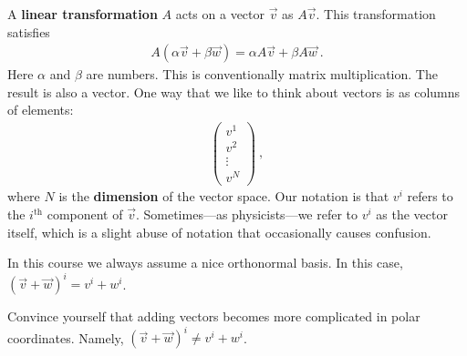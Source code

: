 A \textbf{linear transformation} $A$ acts on a vector $\vec{v}$ as $A\vec{v}$. 
This transformation satisfies
\begin{align}
  A(\alpha \vec{v}+ \beta \vec{w}) = \alpha A\vec{v} + \beta A\vec{w} \ .
\end{align}
Here $\alpha$ and $\beta$ are numbers.
%
This is conventionally matrix multiplication. The result is also a vector. One way that we like to think about vectors is as columns of elements:
\begin{align}
  \begin{pmatrix}
    v^{1} \\ v^{2} \\ \vdots \\ v^{N}
  \end{pmatrix} \ ,
  \label{eq:vector:def:as:column}
\end{align}
where $N$ is the \textbf{dimension} of the vector space. Our notation is that $v^i$ refers to the $i^\text{th}$ component of $\vec{v}$. Sometimes---as physicists---we refer to $v^i$ as the vector itself, which is a slight abuse of notation that occasionally causes confusion.

In this course we always assume a nice orthonormal basis. In this case, $(\vec{v} + \vec{w})^i = v^i + w^i$.
\begin{exercise}
Convince yourself that adding vectors becomes more complicated in polar coordinates. Namely, $(\vec{v} + \vec{w})^i \neq v^i + w^i$.
\end{exercise}

